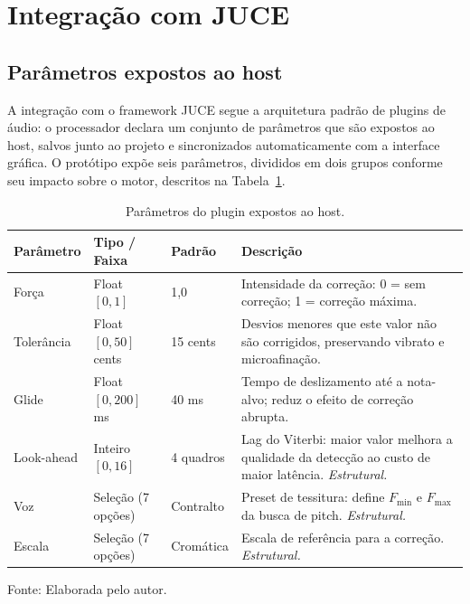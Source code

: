 \section{Integração com JUCE}
\label{sec:impl_juce}

\subsection{Parâmetros expostos ao host}

A integração com o framework JUCE \cite{juce_website,juce_github} segue a arquitetura padrão de plugins de áudio: o processador declara um conjunto de parâmetros que são expostos ao host, salvos junto ao projeto e sincronizados automaticamente com a interface gráfica. O protótipo expõe seis parâmetros, divididos em dois grupos conforme seu impacto sobre o motor, descritos na Tabela~\ref{tab:parametros_plugin}.

\begin{table}[H]
\centering
\caption{\label{tab:parametros_plugin}Parâmetros do plugin expostos ao host.}
\small
\begin{tabular}{|p{2.8cm}|p{2.8cm}|p{2.4cm}|p{5.5cm}|}
\hline
\textbf{Parâmetro} & \textbf{Tipo / Faixa} & \textbf{Padrão} & \textbf{Descrição} \\
\hline
Força          & Float $[0, 1]$         & 1{,}0      & Intensidade da correção: 0 = sem correção; 1 = correção máxima. \\
\hline
Tolerância     & Float $[0, 50]$ cents  & 15 cents   & Desvios menores que este valor não são corrigidos, preservando vibrato e microafinação. \\
\hline
Glide          & Float $[0, 200]$ ms    & 40 ms      & Tempo de deslizamento até a nota-alvo; reduz o efeito de correção abrupta. \\
\hline
Look-ahead     & Inteiro $[0, 16]$      & 4 quadros  & Lag do Viterbi: maior valor melhora a qualidade da detecção ao custo de maior latência. \textit{Estrutural.} \\
\hline
Voz            & Seleção (7 opções)     & Contralto  & Preset de tessitura: define $F_{\min}$ e $F_{\max}$ da busca de pitch. \textit{Estrutural.} \\
\hline
Escala         & Seleção (7 opções)     & Cromática  & Escala de referência para a correção. \textit{Estrutural.} \\
\hline
\end{tabular}
\small Fonte: Elaborada pelo autor.
\end{table}

